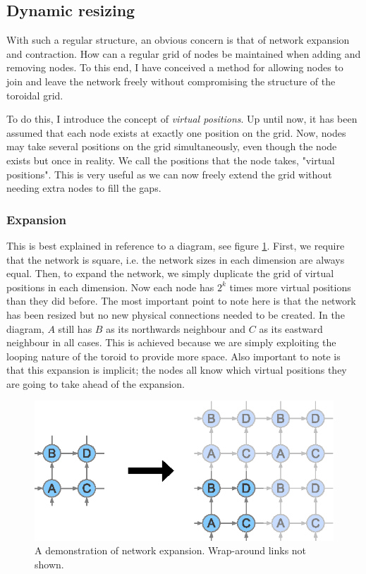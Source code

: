 \documentclass[ %
                    author={Luke Murray},
                supervisor={Dr. Simon Hollis},
                     title={Shadow Peer-to-Peer Networks},
                  subtitle={},
                    degree={MEng},
                      year={2013} ]{thesis}
\begin{document}
\subsection{Dynamic resizing}

With such a regular structure, an obvious concern is that of network expansion and contraction. How can a regular grid of nodes be maintained when adding and removing nodes. To this end, I have conceived a method for allowing nodes to join and leave the network freely without compromising the structure of the toroidal grid.

To do this, I introduce the concept of {\em virtual positions}. Up until now, it has been assumed that each node exists at exactly one position on the grid. Now, nodes may take several positions on the grid simultaneously, even though the node exists but once in reality. We call the positions that the node takes, "virtual positions". This is very useful as we can now freely extend the grid without needing extra nodes to fill the gaps.

\subsubsection{Expansion}

This is best explained in reference to a diagram, see figure \ref{expand}. First, we require that the network is square, i.e. the network sizes in each dimension are always equal. Then, to expand the network, we simply duplicate the grid of virtual positions in each dimension. Now each node has $2^{k}$ times more virtual positions than they did before. The most important point to note here is that the network has been resized but no new physical connections needed to be created. In the diagram, $A$ still has $B$ as its northwards neighbour and $C$ as its eastward neighbour in all cases. This is achieved because we are simply exploiting the looping nature of the toroid to provide more space. Also important to note is that this expansion is implicit; the nodes all know which virtual positions they are going to take ahead of the expansion.

\begin{figure}[h]
    \centering
    \includegraphics{diagrams/network_expand.eps}
    \caption{A demonstration of network expansion. Wrap-around links not shown.}
    \label{expand}
\end{figure}
\end{document}
